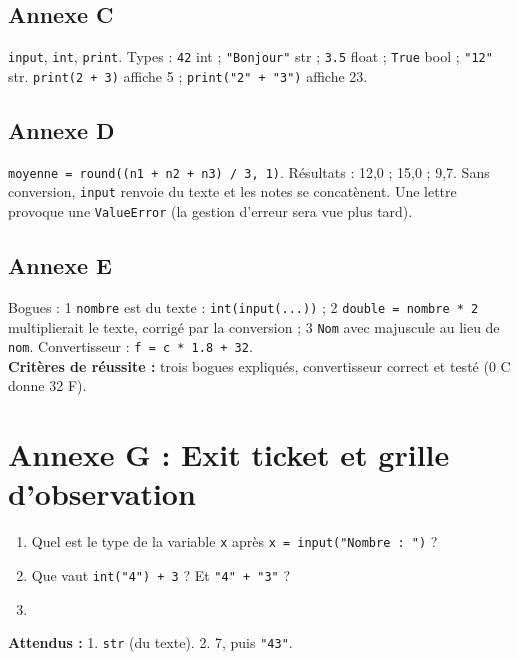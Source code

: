 \documentclass[11pt,a4paper]{article}
\begin{document}
\subsection*{Annexe C}
\texttt{input}, \texttt{int}, \texttt{print}. Types : \texttt{42} int ; \texttt{"Bonjour"} str ; \texttt{3.5} float ; \texttt{True} bool ; \texttt{"12"} str. \texttt{print(2 + 3)} affiche 5 ; \texttt{print("2" + "3")} affiche 23.

\subsection*{Annexe D}
\texttt{moyenne = round((n1 + n2 + n3) / 3, 1)}. Résultats : 12,0 ; 15,0 ; 9,7. Sans conversion, \texttt{input} renvoie du texte et les notes se concatènent. Une lettre provoque une \texttt{ValueError} (la gestion d'erreur sera vue plus tard).

\subsection*{Annexe E}
Bogues : 1 \texttt{nombre} est du texte : \texttt{int(input(...))} ; 2 \texttt{double = nombre * 2} multiplierait le texte, corrigé par la conversion ; 3 \texttt{Nom} avec majuscule au lieu de \texttt{nom}. Convertisseur : \texttt{f = c * 1.8 + 32}.\\
\textbf{Critères de réussite :} trois bogues expliqués, convertisseur correct et testé (0 \degre{}C donne 32 \degre{}F).

\newpage
\section*{Annexe G : Exit ticket et grille d'observation}

\begin{enumerate}
 \item Quel est le type de la variable \texttt{x} après \texttt{x = input("Nombre : ")} ?\\ \lig
 \item Que vaut \texttt{int("4") + 3} ? Et \texttt{"4" + "3"} ?\\ \lig
 \item \autoeval
\end{enumerate}
\textbf{Attendus :} 1. \texttt{str} (du texte). 2. 7, puis \texttt{"43"}.

\bigskip
{}
\end{document}
